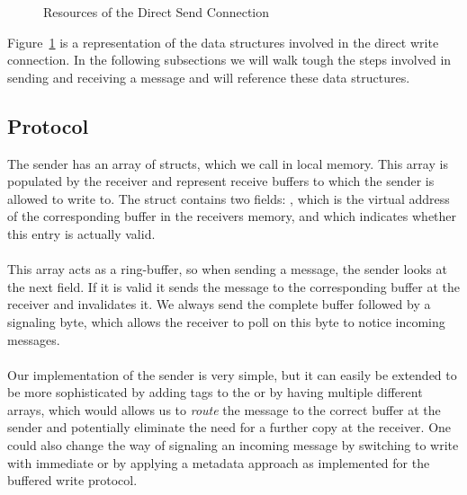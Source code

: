 \begin{figure}[!htb]
\begin{center}
\end{center}
\caption{Resources of the Direct Send Connection}
\label{fig:dirwrite-resources}
\end{figure}

Figure~\ref{fig:dirwrite-resources} is a representation of the data structures involved in the direct write 
connection. In the following subsections we will walk tough the steps involved in sending and receiving a message and
will reference these data structures.

\subsection{Protocol}

The sender has an array of structs, which we call  in local memory. This array is populated by the 
receiver and represent receive buffers to which the sender is allowed to write to. The struct contains two fields: 
, which is the virtual address of the corresponding buffer in the receivers memory, and  which 
indicates whether this entry is actually valid. 

\paragraph{} This array acts as a ring-buffer, so when sending a message, the sender looks at the next field. If it is
valid it sends the message to the corresponding buffer at the receiver and invalidates it. We always send the complete
buffer followed by a signaling byte, which allows the receiver to poll on this byte to notice incoming messages.

\paragraph{} Our implementation of the sender is very simple, but it can easily be extended to be more sophisticated by adding
tags to the  or by having multiple different arrays, which would allows us to \emph{route} the message to the
correct buffer at the sender and potentially eliminate the need for a further copy at the receiver. One could also change
the way of signaling an incoming message by switching to write with immediate or by applying a metadata approach as implemented
for the buffered write protocol.


